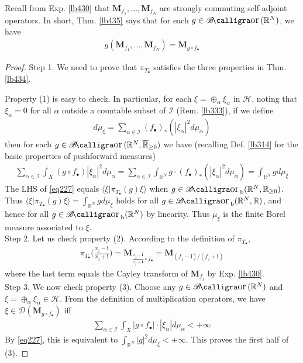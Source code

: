 \documentclass[12pt,b5paper,notitlepage]{article}
\theoremstyle{definition}
\theoremstyle{plain}
\DeclareMathOperator{\Bor}{\mathscr{B}\text{\kern -2pt {\calligra\large or}}\,}
\DeclareMathOperator{\Borb}{{\mathscr{B}\text{\kern -2pt {\calligra\large or}}\,}_{\mathrm b}}
\newcommand{\ovl}{\overline}
\newcommand{\Dom}{\mathscr{D}}
\newcommand{\bk}[1]{\langle {#1}\rangle}
\newcommand{\im}{\mathbf{i}}
\newcommand{\blt}{\bullet}
\newcommand{\Rbb}{\mathbb R}
\newcommand{\MH}{\mathcal H}
\newcommand{\SI}{\mathscr I}
\newcommand{\Mbf}{\mathbf M}
\numberwithin{equation}{section}
\begin{document}
Recall from Exp. \ref{lb430} that $\Mbf_{f_1},\dots,\Mbf_{f_N}$ are strongly commuting self-adjoint operators. In short, Thm. \ref{lb435} says that for each $g\in\Bor(\Rbb^N)$, we have
\begin{align*}
g(\Mbf_{f_1},\dots,\Mbf_{f_N})=\Mbf_{g\circ f_\blt}
\end{align*}

\begin{proof}
Step 1. We need to prove that $\pi_{T_\blt}$ satisfies the three properties in Thm. \ref{lb434}.

Property (1) is easy to check. In particular, for each $\xi=\oplus_\alpha\xi_\alpha$ in $\MH$, noting that $\xi_\alpha=0$ for all $\alpha$ outside a countable subset of $\SI$ (Rem. \ref{lb333}), if we define
\begin{align}
d\mu_\xi=\sum_{\alpha\in\SI}(f_\blt)_*(|\xi_\alpha|^2d\mu_\alpha)
\end{align}
then for each $g\in\Bor(\Rbb^N,\ovl{\Rbb}_{\geq0})$ we have (recalling Def. \ref{lb314} for the basic properties of pushforward measures)
\begin{align}\label{eq227}
\sum_{\alpha\in\SI}\int_X(g\circ f_\blt)|\xi_\alpha|^2d\mu_\alpha=\sum_{\alpha\in\SI}\int_{\Rbb^N}g\cdot (f_\blt)_*(|\xi_\alpha|^2d\mu_\alpha)=\int_{\Rbb^N}gd\mu_\xi
\end{align}
The LHS of \eqref{eq227} equals $\bk{\xi|\pi_{T_\blt}(g)\xi}$ when $g\in\Borb(\Rbb^N,\Rbb_{\geq0})$. Thus $\bk{\xi|\pi_{T_\blt}(g)\xi}=\int_{\Rbb^N}gd\mu_\xi$ holds for all $g\in\Borb(\Rbb^N,\Rbb)$, and hence for all $g\in\Borb(\Rbb^N)$ by linearity. Thus $\mu_\xi$ is the finite Borel measure associated to $\xi$.\\[-1ex]

Step 2. Let us check property (2). According to the definition of $\pi_{T_\blt}$,
\begin{align*}
\pi_{T_\blt}\Big(\frac{x_j-\im}{x_j+\im}\Big)=\Mbf_{\frac{x_j-\im}{x_j+\im}\circ f_\blt}=\Mbf_{(f_j-\im)/(f_j+\im)}
\end{align*}
where the last term equals the Cayley transform of $\Mbf_{f_j}$ by Exp. \ref{lb430}.\\[-1ex]

Step 3. We now check property (3). Choose any $g\in\Bor(\Rbb^N)$ and $\xi=\oplus_\alpha\xi_\alpha\in\MH$. From the definition of multiplication operators, we have $\xi\in\Dom(\Mbf_{g\circ f_\blt})$ iff
\begin{align*}
\sum_{\alpha\in\SI}\int_X |g\circ f_\blt|\cdot|\xi_\alpha|d\mu_\alpha<+\infty
\end{align*}
By \eqref{eq227}, this is equivalent to $\int_{\Rbb^N}|g|^2d\mu_\xi<+\infty$. This proves the first half of (3).


\end{proof}
\end{document}
